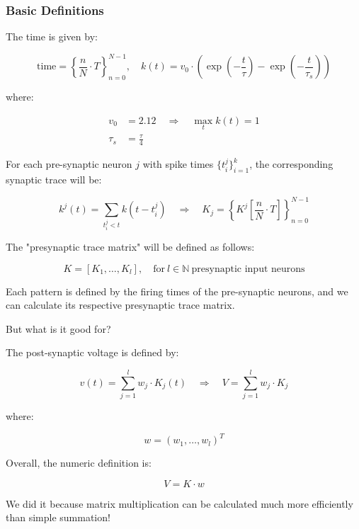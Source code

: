 \subsubsection{Basic Definitions}

The time is given by:

\begin{equation} \label{eq:cuba-model}
    \text{time} = \left\{\frac{n}{N} \cdot T\right\}_{n=0}^{N-1}, \quad k(t) = v_0 \cdot \left(\exp\left(-\frac{t}{\tau}\right) - \exp\left(-\frac{t}{\tau_s}\right)\right)
\end{equation}

where:

\begin{align*}
    v_0 &= 2.12 \quad \Rightarrow \quad \max_t k(t) = 1 \\
    \tau_s &= \frac{\tau}{4}
\end{align*}

For each pre-synaptic neuron $j$ with spike times $\{t_i^j\}_{i=1}^k$, the corresponding synaptic trace will be:

\begin{equation}
    k^j(t) = \sum_{t_i^j < t} k(t - t_i^j) \quad \Rightarrow \quad K_j = \left\{K^j\left[\frac{n}{N} \cdot T\right]\right\}_{n=0}^{N-1}
\end{equation}

The "presynaptic trace matrix" will be defined as follows:

\begin{equation}
    K = [K_1, \dots, K_l], \quad \text{for} \ l \in \mathbb{N} \ \text{presynaptic input neurons}
\end{equation}

Each pattern is defined by the firing times of the pre-synaptic neurons, and we can calculate its respective presynaptic trace matrix.

But what is it good for?

The post-synaptic voltage is defined by:

\begin{equation}
    v(t) = \sum_{j=1}^l w_j \cdot K_j(t) \quad \Rightarrow \quad V = \sum_{j=1}^l w_j \cdot K_j
\end{equation}

where:

\begin{equation}
    w = (w_1, \dots, w_l)^T
\end{equation}

Overall, the numeric definition is:

\begin{equation}
    V = K \cdot w
\end{equation}

We did it because matrix multiplication can be calculated much more efficiently than simple summation!
